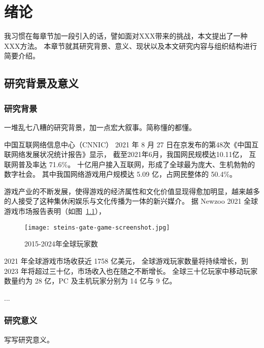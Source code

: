 
\chapter{绪论}

我习惯在每章节加一段引入的话，譬如面对XXX带来的挑战，本文提出了一种XXX方法。
本章节就其研究背景、意义、现状以及本文研究内容与组织结构进行简要介绍。


\section{研究背景及意义}

\subsection{研究背景}

一堆乱七八糟的研究背景，加一点宏大叙事。简称懂的都懂。

中国互联网络信息中心（CNNIC） 2021 年 8 月 27 日在京发布的第48次《中国互联网络发展状况统计报告》显示，
截至2021年6月，我国网民规模达10.11亿，
互联网普及率达 71.6\%。
十亿用户接入互联网，形成了全球最为庞大、生机勃勃的数字社会。\cite{cnnic48report}
其中我国网络游戏用户规模达 5.09 亿，占网民整体的 50.4\%。



游戏产业的不断发展，使得游戏的经济属性和文化价值显现得愈加明显，越来越多的人接受了这种集休闲娱乐与文化传播为一体的新兴媒介。
据 Newzoo 2021 全球游戏市场报告\cite{newzoo2021report}表明（如图~\ref{fig:newzoo-player-forecast}），
\begin{figure}[htb]
  \centering
  \texttt{[image: steins-gate-game-screenshot.jpg]}
  \caption{2015-2024年全球玩家数\cite{newzoo2021report}}
  \label{fig:newzoo-player-forecast}
\end{figure}
2021 年全球游戏市场收获近 1758 亿美元，
全球游戏玩家数量将持续增长，到 2023 年将超过三十亿，市场收入也在随之不断增长。
全球三十亿玩家中移动玩家数量约为 28 亿，PC 及主机玩家分别为 14 亿与 9 亿。

...

\subsection{研究意义}

写写研究意义。

